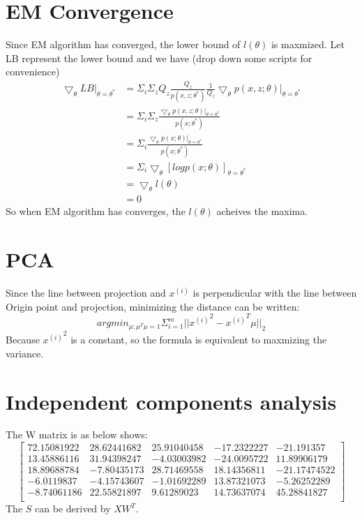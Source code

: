 \documentclass[12pt]{article}
\begin{document}
    \section*{EM Convergence }
    Since EM algorithm has converged, the lower bound of $l(\theta)$ is maxmized.
    Let LB represent the lower bound and we have (drop down some scripts for convenience)
    \begin{equation*}
        \begin{split}
            \bigtriangledown_\theta LB |_{\theta=\theta^*} &= \Sigma_i \Sigma_z Q_z \frac{Q_z}{p(x,z;\theta^*)}\frac{1}{Q_z} \bigtriangledown_\theta p(x,z;\theta) |_{\theta=\theta^*} \\
            &= \Sigma_i \Sigma_z \frac{\bigtriangledown_\theta p(x,z;\theta) |_{\theta=\theta^*}}{p(x;\theta^*)} \\
            &= \Sigma_i \frac{\bigtriangledown_\theta p(x;\theta) |_{\theta=\theta^*}}{p(x;\theta^*)} \\
            &= \Sigma_i \bigtriangledown_\theta [log p(x;\theta)]_{\theta=\theta^*} \\
            &= \bigtriangledown_\theta l(\theta) \\
            &= 0
        \end{split}
    \end{equation*}
    So when EM algorithm has converges, the $l(\theta)$ acheives the maxima.
    

    \section*{PCA}
    Since the line between projection and $x^{(i)}$ is perpendicular with the line between Origin point and projection, 
    minimizing the distance can be written:
    $$arg {min}_{\mu : \mu^T \mu=1 } \Sigma_{i=1}^m ||{x^{(i)}}^2-{x^{(i)}}^{T} \mu||_2$$
    Because ${x^{(i)}}^2$ is a constant, so the formula is equivalent to maxmizing the variance.


    \section*{Independent components analysis}
    The W matrix is as below shows:
   $$\left[ 
    \begin{matrix} 
    72.15081922&  28.62441682&  25.91040458& -17.2322227&  -21.191357 \\
    13.45886116 & 31.94398247&  -4.03003982& -24.0095722&   11.89906179\\
    18.89688784 & -7.80435173 & 28.71469558&  18.14356811& -21.17474522\\
    -6.0119837  & -4.15743607 & -1.01692289&  13.87321073&  -5.26252289\\
    -8.74061186 & 22.55821897&   9.61289023 & 14.73637074&  45.28841827\\
    \end{matrix}
    \right]$$
    The $S$ can be derived by $XW^T$.
\end{document}
